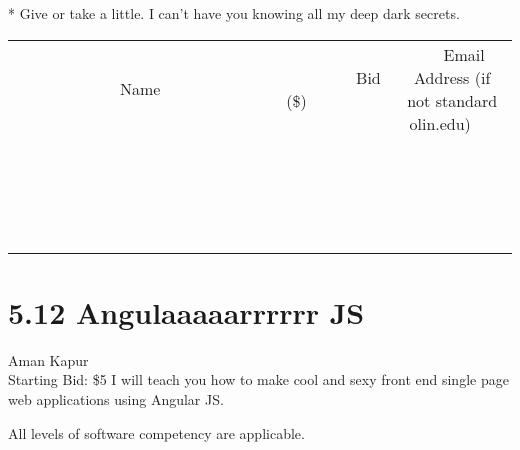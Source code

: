 \documentclass[11pt]{article}
\begin{document}
* Give or take a little. I can't have you knowing all my deep dark secrets.
\\[3ex]
\begin{tabular}{c c c}
~~~~~~~~~~~~~Name~~~~~~~~~~~~~ & ~~~~~~~~~Bid (\$)~~~~~~~~~  & ~~~Email Address (if not standard olin.edu)~~~\\
 & & \\
\hline
 & & \\
\hline
 & & \\
\hline
 & & \\
\hline
 & & \\
\hline
 & & \\
\hline
 & & \\
\hline
 & & \\
\hline
 & & \\
\hline
 & & \\
\hline
 & & \\
\hline
 & & \\
\hline
 & & \\
\hline
 & & \\
\hline
 & & \\
\hline
 & & \\
\hline
 & & \\
\hline
 & & \\
\hline
 & & \\
\hline
\end{tabular}
\newpage
\section*{5.12 Angulaaaaarrrrrr JS}
Aman Kapur
\\
Starting Bid: \$5
\newline
I will teach you how to make cool and sexy front end single page web applications using Angular JS. 

All levels of software competency are applicable. 
\end{document}
